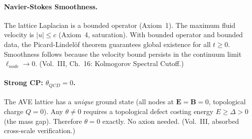 \paragraph{Navier-Stokes Smoothness.}
The lattice Laplacian is a bounded operator (Axiom~1).  The maximum
fluid velocity is $|u| \le c$ (Axiom~4, saturation).  With bounded
operator and bounded data, the Picard-Lindel\"of theorem guarantees
global existence for all $t \ge 0$.  Smoothness follows because the
velocity bound persists in the continuum limit $\ell_{node} \to 0$.
(Vol.~III, Ch.~16: Kolmogorov Spectral Cutoff.)

\paragraph{Strong CP: $\theta_{QCD} = 0$.}
The AVE lattice has a \textit{unique} ground state (all nodes at
$\mathbf{E} = \mathbf{B} = 0$, topological charge $Q = 0$).  Any
$\theta \ne 0$ requires a topological defect costing energy
$E \ge \Delta > 0$ (the mass gap).  Therefore $\theta = 0$ exactly.
No axion needed.  (Vol.~III, absorbed cross-scale verification.)

